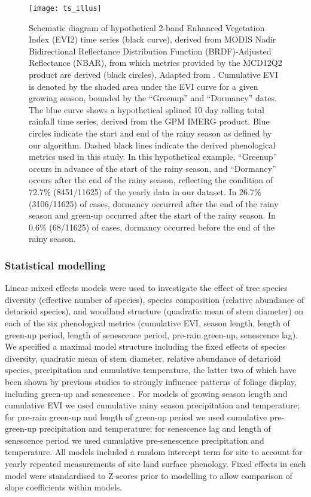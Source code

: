 \documentclass[11pt,a4paper]{article}
\begin{document}
\begin{figure}[H]
\centering
	\texttt{[image: ts\_illus]}
	\caption{Schematic diagram of hypothetical 2-band Enhanced Vegetation Index
		(EVI2) time series (black curve), derived from MODIS Nadir Bidirectional
		Reflectance Distribution Function (BRDF)-Adjusted Reflectance (NBAR),
		from which metrics provided by the MCD12Q2 product are derived (black
		circles), Adapted from \citet{Gray2022}. Cumulative EVI is denoted by
		the shaded area under the EVI curve for a given growing season, bounded
		by the ``Greenup'' and ``Dormancy'' dates. The blue curve shows a
		hypothetical splined 10 day rolling total rainfall time series, derived
		from the GPM IMERG product. Blue circles indicate the start and end of
		the rainy season as defined by our algorithm. Dashed black lines
		indicate the derived phenological metrics used in this study. In this
		hypothetical example, ``Greenup'' occurs in advance of the start of the
		rainy season, and ``Dormancy'' occurs after the end of the rainy
		season, reflecting the condition of 72.7\% (\num{8451}/\num{11625}) of
		the yearly data in our dataset. In 26.7\% (\num{3106}/\num{11625}) of
		cases, dormancy occurred after the end of the rainy season and green-up
	occurred after the start of the rainy season. In 0.6\%
(\num{68}/\num{11625}) of cases, dormancy occurred before the end of the rainy
season.}
	\label{ts_illus}
\end{figure}

\subsubsection{Statistical modelling}

Linear mixed effects models were used to investigate the effect of tree species
diversity (effective number of species), species composition (relative
abundance of detarioid species), and woodland structure (quadratic mean of stem
diameter) on each of the six phenological metrics (cumulative EVI, season
length, length of green-up period, length of senescence period, pre-rain
green-up, senescence lag). We specified a maximal model structure including the
fixed effects of species diversity, quadratic mean of stem diameter, relative
abundance of detarioid species, precipitation and cumulative temperature, the
latter two of which have been shown by previous studies to strongly influence
patterns of foliage display, including green-up and senescence
\citep{Whitecross2017, Adole2019}. For models of growing season length and
cumulative EVI we used cumulative rainy season precipitation and temperature;
for pre-rain green-up and length of green-up period we used cumulative
pre-green-up precipitation and temperature; for senescence lag and length of
senescence period we used cumulative pre-senescence precipitation and
temperature. All models included a random intercept term for site to account
for yearly repeated measurements of site land surface phenology. Fixed effects
in each model were standardised to Z-scores prior to modelling to allow
comparison of slope coefficients within models. 
\end{document}
